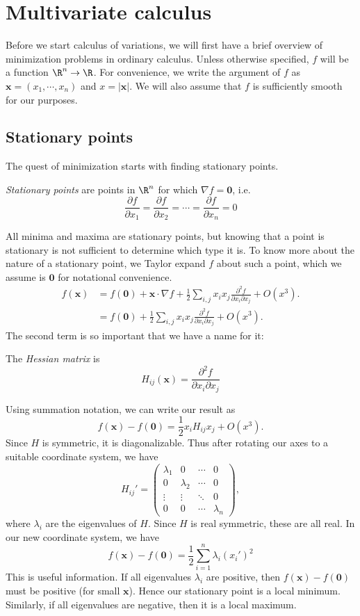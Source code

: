 \documentclass[a4paper]{article}
\begin{document}
\section{Multivariate calculus}
Before we start calculus of variations, we will first have a brief overview of minimization problems in ordinary calculus. Unless otherwise specified, $f$ will be a function $\R^n \to \R$. For convenience, we write the argument of $f$ as $\mathbf{x} = (x_1, \cdots, x_n)$ and $x = |\mathbf{x}|$. We will also assume that $f$ is sufficiently smooth for our purposes.

\subsection{Stationary points}
The quest of minimization starts with finding stationary points.
\begin{defi}
  \emph{Stationary points} are points in $\R^n$ for which $\nabla f = \mathbf{0}$, i.e.
  \[
    \frac{\partial f}{\partial x_1} = \frac{\partial f}{\partial x_2} = \cdots = \frac{\partial f}{\partial x_n} = 0
  \]
\end{defi}
All minima and maxima are stationary points, but knowing that a point is stationary is not sufficient to determine which type it is. To know more about the nature of a stationary point, we Taylor expand $f$ about such a point, which we assume is $\mathbf{0}$ for notational convenience.
\begin{align*}
  f(\mathbf{x}) &= f(\mathbf{0}) + \mathbf{x}\cdot \nabla f + \frac{1}{2}\sum_{i, j}x_ix_j\frac{\partial^2 f}{\partial x_i \partial x_j} + O(x^3).\\
  &= f(\mathbf{0}) + \frac{1}{2}\sum_{i, j}x_ix_j\frac{\partial^2 f}{\partial x_i \partial x_j} + O(x^3).
\end{align*}
The second term is so important that we have a name for it:
\begin{defi}
  The \emph{Hessian matrix} is
  \[
    H_{ij}(\mathbf{x}) = \frac{\partial^2 f}{\partial x_i \partial x_j}
  \]
\end{defi}
Using summation notation, we can write our result as
\[
  f(\mathbf{x}) - f(\mathbf{0}) = \frac{1}{2}x_i H_{ij}x_j + O(x^3).
\]
Since $H$ is symmetric, it is diagonalizable. Thus after rotating our axes to a suitable coordinate system, we have
\[
  H_{ij}' =
  \begin{pmatrix}
    \lambda_1 & 0 & \cdots & 0\\
    0 & \lambda_2 & \cdots & 0\\
    \vdots & \vdots & \ddots & 0\\
    0 & 0 & \cdots & \lambda_n
  \end{pmatrix},
\]
where $\lambda_i$ are the eigenvalues of $H$. Since $H$ is real symmetric, these are all real. In our new coordinate system, we have
\[
  f(\mathbf{x}) - f(\mathbf{0}) = \frac{1}{2}\sum_{i = 1}^n \lambda_i (x_i')^2
\]
This is useful information. If all eigenvalues $\lambda_i$ are positive, then $f(\mathbf{x}) - f(\mathbf{0})$ must be positive (for small $\mathbf{x}$). Hence our stationary point is a local minimum. Similarly, if all eigenvalues are negative, then it is a local maximum.
\end{document}
